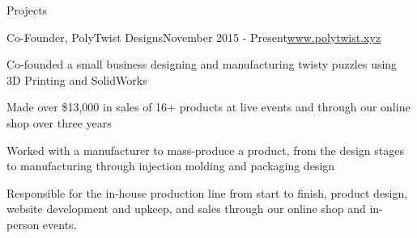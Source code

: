 \documentclass{resume} %
\begin{document}
\begin{rSection}{Projects}

\begin{rSubsection}{Co-Founder, PolyTwist Designs}{November 2015 - Present}{\url{www.polytwist.xyz}}{}
\item Co-founded a small business designing and manufacturing twisty puzzles using 3D Printing and SolidWorks
\item Made over \$13,000 in sales of 16+ products at live events and through our online shop over three years
\item Worked with a manufacturer to mass-produce a product, from the design stages to manufacturing through injection molding and packaging design
\item Responsible for the in-house production line from start to finish, product design, website development and upkeep, and sales through our online shop and in-person events.
\end{rSubsection}



\end{rSection}


\end{document}
